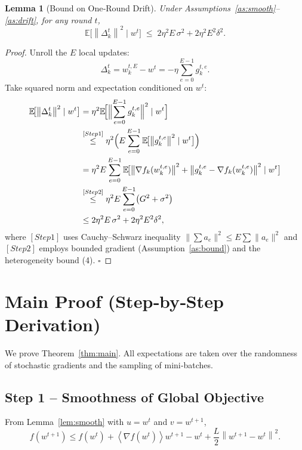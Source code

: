 \documentclass{article}
\newtheorem{lemma}{Lemma}
\newcommand{\E}{\mathbb{E}}
\newcommand{\norm}[1]{\left\|#1\right\|}
\newcommand{\inner}[1]{\left\langle #1 \right\rangle}
\begin{document}
\begin{lemma}[Bound on One‑Round Drift]\label{lem:drift}
Under Assumptions~\ref{as:smooth}–\ref{as:drift},
for any round $t$,
\[
\E\!\bigl[\norm{\Delta_{k}^{t}}^2\mid w^{t}\bigr]
\;\le\;
2\eta^{2}E\,\sigma^{2}+2\eta^{2}E^{2}\delta^{2}.
\tag{7}
\]
\end{lemma}
\begin{proof}
Unroll the $E$ local updates:
\[
\Delta_{k}^{t}=w_{k}^{t,E}-w^{t}
 = -\eta\sum_{e=0}^{E-1} g_{k}^{t,e}.
\]
Take squared norm and expectation conditioned on $w^{t}$:
\[
\begin{aligned}
\E\!\bigl[\norm{\Delta_{k}^{t}}^2\mid w^{t}\bigr]
&=\eta^{2}\E\!\Bigl[\Bigl\|\sum_{e=0}^{E-1} g_{k}^{t,e}\Bigr\|^{2}\mid w^{t}\Bigr] \\
&\stackrel{[Step 1]}{\le}
\eta^{2}\Bigl(E\sum_{e=0}^{E-1}\E\!\bigl[\norm{g_{k}^{t,e}}^{2}\mid w^{t}\bigr]\Bigr) \\
&=\eta^{2}E\sum_{e=0}^{E-1}\E\!\bigl[\norm{\nabla f_k(w_{k}^{t,e})}^{2}
      +\norm{g_{k}^{t,e}-\nabla f_k(w_{k}^{t,e})}^{2}\mid w^{t}\bigr] \\
&\stackrel{[Step 2]}{\le}
\eta^{2}E\sum_{e=0}^{E-1}\bigl(G^{2}+\sigma^{2}\bigr) \\
&\le 2\eta^{2}E\,\sigma^{2}+2\eta^{2}E^{2}\delta^{2},
\end{aligned}
\]
where \([Step 1]\) uses Cauchy–Schwarz inequality
\(\|\sum a_e\|^{2}\le E\sum\|a_e\|^{2}\) and \([Step 2]\) employs
bounded gradient (Assumption~\ref{as:bound}) and the heterogeneity bound (4). \hfill $\square$
\end{proof}

\section*{Main Proof (Step‑by‑Step Derivation)}
We prove Theorem~\ref{thm:main}.  
All expectations are taken over the randomness of stochastic gradients
and the sampling of mini‑batches.

\subsection*{Step 1 – Smoothness of Global Objective}
From Lemma~\ref{lem:smooth} with $u=w^{t}$ and $v=w^{t+1}$,
\[
f(w^{t+1})\le f(w^{t})+\inner{\nabla f(w^{t})}{w^{t+1}-w^{t}}
          +\frac{L}{2}\norm{w^{t+1}-w^{t}}^{2}.
\tag{8}
\]
\end{document}

